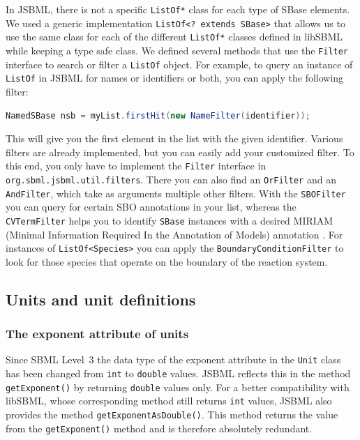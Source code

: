 In JSBML, there is not a specific
\texttt{ListOf*} class for each type of SBase
elements. We used a generic implementation
\texttt{ListOf<?~extends SBase>} that allows us to use the same class for each
of the different \texttt{ListOf*} classes defined in libSBML while keeping a
type safe class. We defined several methods that use the \texttt{Filter}
interface to search or filter a \texttt{ListOf} object. For example, to query an
instance of \texttt{ListOf} in JSBML for names or identifiers or both, you can
apply the following filter:
\begin{lstlisting}[language=Java,numbers=none]
NamedSBase nsb = myList.firstHit(new NameFilter(identifier));
\end{lstlisting}
This will give you the first element in the list with the given identifier.
Various filters are already implemented, but you can easily add your
customized filter. To this end, you only have to implement the \texttt{Filter}
%
interface in \texttt{org.sbml.jsbml.util.filters}.
%
There you can also find an \texttt{OrFilter} and an \texttt{AndFilter}, which
take as arguments multiple other filters. With the \texttt{SBOFilter} you can
query for certain SBO  annotations \citep{Novere2006,Novere2006b}
%
in your list, whereas the \texttt{CVTermFilter} helps you to identify
\texttt{SBase}
%
instances with a desired MIRIAM (Minimal Information Required In the Annotation
of Models) annotation \citep{Novere2005}. For instances of
\texttt{ListOf<Species>} you can apply the \texttt{BoundaryConditionFilter} to
look for those species that operate on the
boundary of the reaction system.


\subsection{Units and unit definitions}
\subsubsection{The exponent attribute of units}

Since SBML Level~3 \citep{Hucka2010a} the data type of the
exponent attribute in the \texttt{Unit} class has been changed from \texttt{int}
to \texttt{double} values. JSBML
%
%
%
reflects this in the method \texttt{getExponent()} by returning \texttt{double}
values only. For a better compatibility with libSBML, whose corresponding method
still returns \texttt{int} values, JSBML also provides the method
\texttt{getExponentAsDouble()}. This method returns the value from the
\texttt{getExponent()} method and is therefore absolutely redundant.


